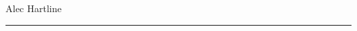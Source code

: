\documentclass[11pt]{article}
\begin{document}
\begin{center}
{\fontsize{42}{50.4}\hspace{0.75cm}\selectfont Alec Hartline}\\
\noindent\rule{\linewidth}{1pt}
\end{center}
    \begin{minipage}[t]{10cm}
        
    \end{minipage}
	\begin{minipage}[t]{10cm}
	    \vspace{-6.25cm}
	    \begin{flushright}
            
		\end{flushright}
    \end{minipage}\\
	\begin{minipage}[t]{10cm}
	    \begin{flushright}
		    \vspace{-2.15cm}
            
		\end{flushright}
    \end{minipage}
	\begin{minipage}[t]{10cm}
	    \begin{flushright}
            
		\end{flushright}
    \end{minipage}
\end{document}
